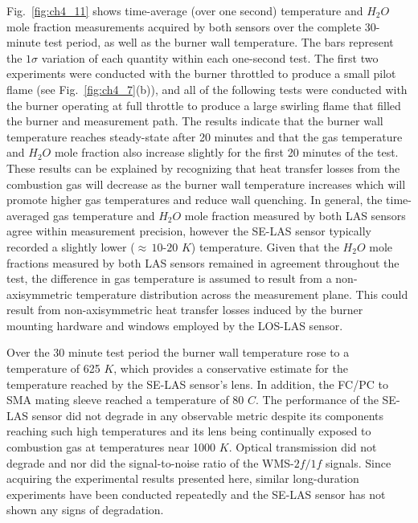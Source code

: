 Fig.\ \ref{fig:ch4_11} shows time-average (over one second) temperature and $H_2O$ mole fraction measurements acquired by both sensors over the complete 30-minute test period, as well as the burner wall temperature. The bars represent the $1\sigma$ variation of each quantity within each one-second test. The first two experiments were conducted with the burner throttled to produce a small pilot flame (see Fig.\ \ref{fig:ch4_7}(b)), and all of the following tests were conducted with the burner operating at full throttle to produce a large swirling flame that filled the burner and measurement path. The results indicate that the burner wall temperature reaches steady-state after 20 minutes and that the gas temperature and $H_2O$ mole fraction also increase slightly for the first 20 minutes of the test. These results can be explained by recognizing that heat transfer losses from the combustion gas will decrease as the burner wall temperature increases which will promote higher gas temperatures and reduce wall quenching. In general, the time-averaged gas temperature and $H_2O$ mole fraction measured by both LAS sensors agree within measurement precision, however the SE-LAS sensor typically recorded a slightly lower ($\approx \,10$-$20$ $K$) temperature. Given that the $H_2O$ mole fractions measured by both LAS sensors remained in agreement throughout the test, the difference in gas temperature is assumed to result from a non-axisymmetric temperature distribution across the measurement plane. This could result from non-axisymmetric heat transfer losses induced by the burner mounting hardware and windows employed by the LOS-LAS sensor.

Over the 30 minute test period the burner wall temperature rose to a temperature of 625 $K$, which provides a conservative estimate for the temperature reached by the SE-LAS sensor’s lens. In addition, the FC/PC to SMA mating sleeve reached a temperature of 80 $C$. The performance of the SE-LAS sensor did not degrade in any observable metric despite its components reaching such high temperatures and its lens being continually exposed to combustion gas at temperatures near 1000 $K$. Optical transmission did not degrade and nor did the signal-to-noise ratio of the WMS-$2f/1f$ signals. Since acquiring the experimental results presented here, similar long-duration experiments have been conducted repeatedly and the SE-LAS sensor has not shown any signs of degradation.
